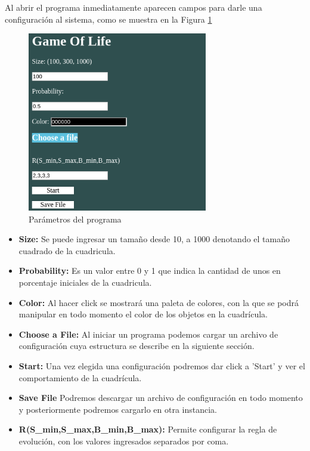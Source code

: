 
Al abrir el programa inmediatamente aparecen campos para darle una configuración al sistema, como se muestra en la Figura \ref{fig:menu}
\begin{figure}[h]
	\centering
	\includegraphics[width=0.7\textwidth]{capitulo2/images/menu.png}
	\caption{Parámetros del programa}
	\label{fig:menu}
\end{figure}
\newpage
\begin{itemize}
	\item \textbf{Size:} Se puede ingresar un tamaño desde 10, a 1000 denotando el tamaño cuadrado de la cuadricula.
	\item \textbf{Probability:} Es un valor entre 0 y 1 que indica la cantidad de unos en porcentaje iniciales de la cuadricula.
	\item \textbf{Color:} Al hacer click se mostrará una paleta de colores, con la que se podrá manipular en todo momento el color de los objetos en la cuadrícula.
	\item \textbf{Choose a File:} Al iniciar un programa podemos cargar un archivo de configuración cuya estructura se describe en la siguiente sección.
	\item \textbf{Start:} Una vez elegida una configuración podremos dar click a 'Start' y ver el comportamiento de la cuadrícula.
	\item \textbf{Save File} Podremos descargar un archivo de configuración en todo momento y posteriormente podremos cargarlo en otra instancia.
	\item \textbf{R(S\_min,S\_max,B\_min,B\_max):} Permite configurar la regla de evolución, con los valores ingresados separados por coma.
\end{itemize}

